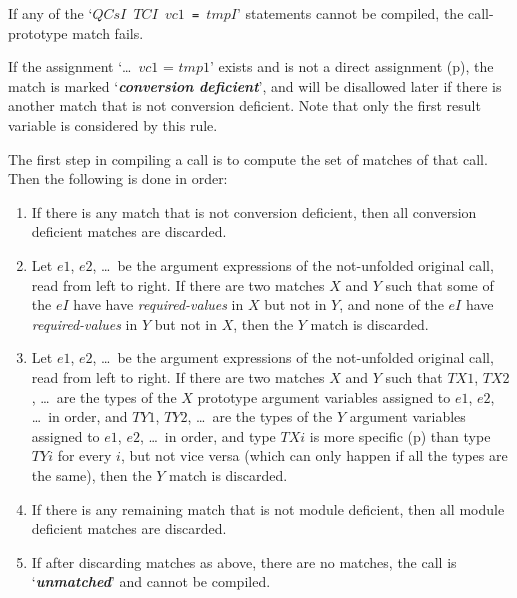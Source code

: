 \documentclass[12pt]{article}
\newcommand{\key}[1]{{\bf \em #1}\index{#1}}
\newcommand{\pagref}[1]{p\pageref{#1}}
\begin{document}
\begin{enumerate}
If any of the `{\tt $QCsI$ $TCI$ $vc1$ = $tmpI$}' statements cannot be
compiled, the call-prototype match fails.

If the assignment `\ldots~$vc1$ = $tmp1$' exists and is not a direct
assignment (\pagref{DIRECT-ASSIGNMENT}), the match is marked
`\key{conversion deficient}'\label{CONVERSION-DEFICIENT},
and will be disallowed later
if there is another match that is not conversion deficient.
Note that only the first result variable is considered by this rule.

\end{enumerate}


The first step in compiling a call is to compute the
set of matches of that call.  Then the following is done in order:

\begin{enumerate}

\item If there is any match that is not conversion deficient, then
all conversion deficient matches are discarded.

\item\label{REQUIRED-ARGUMENTS-PREFERRED}
Let $e1$, $e2$, \ldots{}~be the argument expressions of
the not-unfolded original call, read from left to right.
If there are two matches $X$ and $Y$ such that
some of the $eI$ have
have {\em required-values} in $X$ but not in $Y$, and none of the $eI$
have {\em required-values} in $Y$ but not in $X$,
then the $Y$ match is discarded.

\item\label{MORE-SPECIFIC-ARGUMENT-TYPES-PREFERRED}
Let $e1$, $e2$, \ldots{}~be the argument expressions of
the not-unfolded original call, read from left to right.
If there are two matches $X$ and $Y$ such that
$TX1$, $TX2$, \ldots{}~are the types of the $X$ prototype argument
variables assigned to $e1$, $e2$, \ldots{}~in order, and
$TY1$, $TY2$, \ldots{}~are the types of the $Y$ argument
variables assigned to $e1$, $e2$, \ldots{}~in order,
and type $TXi$ is more specific (\pagref{MORE-SPECIFIC-RELATION})
than type $TYi$ for
every $i$, but not vice versa (which can only happen if
all the types are the same),
then the $Y$ match is discarded.

\item If there is any remaining match that is not module deficient, then
all module deficient matches are discarded.

\item If after discarding matches as above, there are no matches,
the call is `\key{unmatched}' and cannot be compiled.


\end{enumerate}
\end{document}
